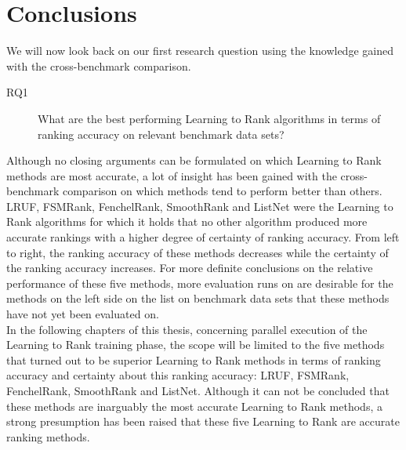 \section{Conclusions}
We will now look back on our first research question using the knowledge gained with the cross-benchmark comparison.
\begin{description}
\item[RQ1] What are the best performing Learning to Rank algorithms in terms of ranking accuracy on relevant benchmark data sets?\\
\end{description}
Although no closing arguments can be formulated on which Learning to Rank methods are most accurate, a lot of insight has been gained with the cross-benchmark comparison on which methods tend to perform better than others.\\

LRUF, FSMRank, FenchelRank, SmoothRank and ListNet were the Learning to Rank algorithms for which it holds that no other algorithm produced more accurate rankings with a higher degree of certainty of ranking accuracy. From left to right, the ranking accuracy of these methods decreases while the certainty of the ranking accuracy increases. For more definite conclusions on the relative performance of these five methods, more evaluation runs on are desirable for the methods on the left side on the list on benchmark data sets that these methods have not yet been evaluated on.\\

In the following chapters of this thesis, concerning parallel execution of the Learning to Rank training phase, the scope will be limited to the five methods that turned out to be superior Learning to Rank methods in terms of ranking accuracy and certainty about this ranking accuracy: LRUF, FSMRank, FenchelRank, SmoothRank and ListNet. Although it can not be concluded that these methods are inarguably the most accurate Learning to Rank methods, a strong presumption has been raised that these five Learning to Rank are accurate ranking methods.